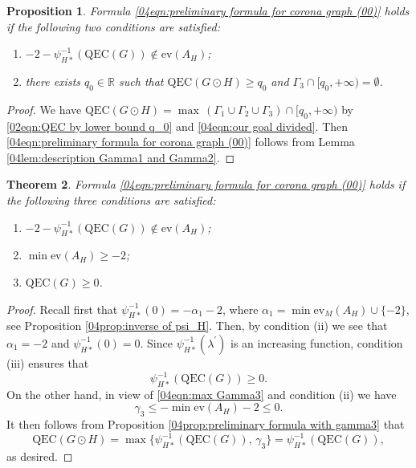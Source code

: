 \documentclass[12pt,a4paper]{article}
\newtheorem{theorem}{Theorem}[section]
\newtheorem{proposition}[theorem]{Proposition}
\newcommand{\1}{{\bm 1}}
\numberwithin{equation}{section}
\begin{document}
\begin{proposition}\label{04prop:preliminary formula for corona graph}
Formula \eqref{04eqn:preliminary formula for corona graph (00)} holds if
the following two conditions are satisfied:
\begin{enumerate}
\item[\upshape (i)] $-2-\psi_{H*}^{-1}(\mathrm{QEC}(G)) \not\in\mathrm{ev}(A_H)$;
\item[\upshape (ii)] there exists $q_0\in\mathbb{R}$ such that
$\mathrm{QEC}(G\odot H)\ge q_0$ and
$\Gamma_3\cap[q_0, +\infty)=\emptyset$.
\end{enumerate}
\end{proposition}

\begin{proof}
We have $\mathrm{QEC}(G\odot H)
=\max\,(\Gamma_1\cup \Gamma_2\cup\Gamma_3)\cap[q_0,+\infty)$
by \eqref{02eqn:QEC by lower bound q_0} and
\eqref{04eqn:our goal divided}.
Then \eqref{04eqn:preliminary formula for corona graph (00)} 
follows from Lemma \ref{04lem:description Gamma1 and Gamma2}.
\end{proof}



\begin{theorem}\label{04thm:min formula (01)}
Formula \eqref{04eqn:preliminary formula for corona graph (00)} holds if
the following three conditions are satisfied:
%
\begin{enumerate}
\item[\upshape (i)] 
$-2-\psi_{H*}^{-1}(\mathrm{QEC}(G)) \not\in\mathrm{ev}(A_H)$;
\item[\upshape (ii)]
$\min \mathrm{ev}(A_H)\geq -2$;
\item[\upshape (iii)] $\mathrm{QEC}(G)\ge0$.
\end{enumerate}
\end{theorem}

\begin{proof}
Recall first that 
$\psi_{H*}^{-1}(0)=-\alpha_1-2$, where
$\alpha_1=\min\mathrm{ev}_M(A_H)\cup\{-2\}$,
see Proposition \ref{04prop:inverse of psi_H}.
Then, by condition (ii) we see that $\alpha_1=-2$ and
$\psi_{H*}^{-1}(0)=0$.
Since $\psi_{H*}^{-1}(\lambda^\prime)$ is an increasing function,
condition (iii) ensures that
\[
\psi_{H*}^{-1}(\mathrm{QEC}(G))\ge0.
\]
On the other hand, in view of \eqref{04eqn:max Gamma3}
and condition (ii) we have
\[
\gamma_3
\le -\min \mathrm{ev}(A_H)-2
\le 0.
\]
It then follows from Proposition 
\ref{04prop:preliminary formula with gamma3} that
\[
\mathrm{QEC}(G\odot H)
=\max\{\psi_{H*}^{-1}(\mathrm{QEC}(G)),\, \gamma_3\}
=\psi_{H*}^{-1}(\mathrm{QEC}(G)),
\]
as desired.
\end{proof}
\end{document}
